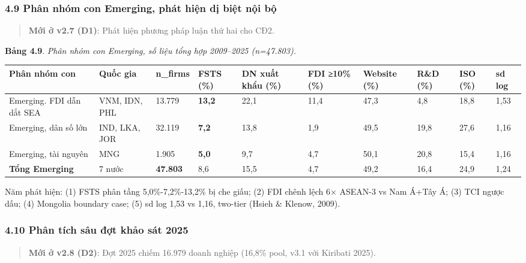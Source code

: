 \documentclass[12pt,a4paper]{article}
\begin{document}
\hypertarget{49-phuxe2n-nhuxf3m-con-emerging-phuxe1t-hiux1ec7n-dux1ecb-biux1ec7t-nux1ed9i-bux1ed9}{%
\subsubsection{4.9 Phân nhóm con Emerging, phát hiện dị biệt nội
bộ}\label{49-phuxe2n-nhuxf3m-con-emerging-phuxe1t-hiux1ec7n-dux1ecb-biux1ec7t-nux1ed9i-bux1ed9}}

\begin{quote}
\textbf{Mới ở v2.7 (D1)}: Phát hiện phương pháp luận thứ hai cho CĐ2.
\end{quote}

\textbf{Bảng 4.9}. \emph{Phân nhóm con Emerging, số liệu tổng hợp
2009--2025 (n=47.803).}

\begin{longtable}[]{@{}llllllllll@{}}
\toprule\noalign{}
Phân nhóm con & Quốc gia & n\_firms & FSTS (\%) & DN xuất khẩu (\%) &
FDI ≥10\% (\%) & Website (\%) & R\&D (\%) & ISO (\%) & sd log \\
\midrule\noalign{}
\endhead
\bottomrule\noalign{}
\endlastfoot
Emerging. FDI dẫn dắt SEA & VNM, IDN, PHL & 13.779 & \textbf{13,2} &
22,1 & 11,4 & 47,3 & 4,8 & 18,8 & 1,53 \\
Emerging, dân số lớn & IND, LKA, JOR & 32.119 & \textbf{7,2} & 13,8 &
1,9 & 49,5 & 19,8 & 27,6 & 1,16 \\
Emerging, tài nguyên & MNG & 1.905 & \textbf{5,0} & 9,7 & 4,7 & 50,1 &
20,8 & 15,4 & 1,16 \\
\textbf{Tổng Emerging} & 7 nước & \textbf{47.803} & 8,6 & 15,5 & 4,7 &
49,2 & 16,4 & 24,9 & 1,24 \\
\end{longtable}

Năm phát hiện: (1) FSTS phân tầng 5,0\%-7,2\%-13,2\% bị che giấu; (2)
FDI chênh lệch 6× ASEAN-3 vs Nam Á+Tây Á; (3) TCI ngược dấu; (4)
Mongolia boundary case; (5) sd log 1,53 vs 1,16, two-tier (Hsieh \&
Klenow, 2009).

\hypertarget{410-phuxe2n-tuxedch-suxe2u-ux111ux1ee3t-khux1ea3o-suxe1t-2025}{%
\subsubsection{4.10 Phân tích sâu đợt khảo sát
2025}\label{410-phuxe2n-tuxedch-suxe2u-ux111ux1ee3t-khux1ea3o-suxe1t-2025}}

\begin{quote}
\textbf{Mới ở v2.8 (D2)}: Đợt 2025 chiếm 16.979 doanh nghiệp (16,8\%
pool, v3.1 với Kiribati 2025).
\end{quote}
\end{document}
